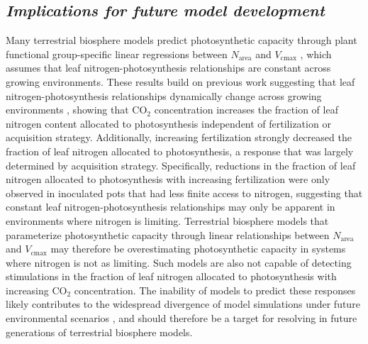 \subsection{\textit{Implications for future model development}}
\noindent Many terrestrial biosphere models predict photosynthetic capacity through plant functional group-specific linear regressions between $N_\mathrm{area}$ and $V_\mathrm{cmax}$ , which assumes that leaf nitrogen-photosynthesis relationships are constant across growing environments. These results build on previous work suggesting that leaf nitrogen-photosynthesis relationships dynamically change across growing environments , showing that CO$_2$ concentration increases the fraction of leaf nitrogen content allocated to photosynthesis independent of fertilization or acquisition strategy. Additionally, increasing fertilization strongly decreased the fraction of leaf nitrogen allocated to photosynthesis, a response that was largely determined by acquisition strategy. Specifically, reductions in the fraction of leaf nitrogen allocated to photosynthesis with increasing fertilization were only observed in inoculated pots that had less finite access to nitrogen, suggesting that constant leaf nitrogen-photosynthesis relationships may only be apparent in environments where nitrogen is limiting. Terrestrial biosphere models that parameterize photosynthetic capacity through linear relationships between $N_\mathrm{area}$ and $V_\mathrm{cmax}$  may therefore be overestimating photosynthetic capacity in systems where nitrogen is not as limiting. Such models are also not capable of detecting stimulations in the fraction of leaf nitrogen allocated to photosynthesis with increasing CO$_2$ concentration. The inability of models to predict these responses likely contributes to the widespread divergence of model simulations under future environmental scenarios , and should therefore be a target for resolving in future generations of terrestrial biosphere models.

